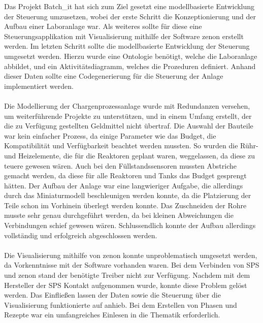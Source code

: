 Das Projekt Batch\_it hat sich zum Ziel gesetzt eine modellbasierte Entwicklung der Steuerung umzusetzen, wobei der erste Schritt die Konzeptionierung und der Aufbau einer Laboranlage war. Als weiteres sollte für diese eine Steuerungsapplikation mit Visualisierung mithilfe der Software zenon erstellt werden. Im letzten Schritt sollte die modellbasierte Entwicklung der Steuerung umgesetzt werden. Hierzu wurde eine Ontologie benötigt, welche die Laboranlage abbildet, und ein Aktivitätsdiagramm, welches die Prozeduren definiert. Anhand dieser Daten sollte eine Codegenerierung für die Steuerung der Anlage implementiert werden. \\\\
Die Modellierung der Chargenprozessanlage wurde mit Redundanzen versehen, um weiterführende Projekte zu unterstützen, und in einem Umfang erstellt, der die zu Verfügung gestellten Geldmittel nicht übertraf. 
Die Auswahl der Bauteile war kein einfacher Prozess, da einige Parameter wie das Budget, die Kompatibilität und Verfügbarkeit beachtet werden mussten. So wurden die Rühr- und Heizelemente, die für die Reaktoren geplant waren, weggelassen, da diese zu teuere gewesen wären. Auch bei den Füllstandssensoren mussten Abstriche gemacht werden, da diese für alle Reaktoren und Tanks das Budget gesprengt hätten.
Der Aufbau der Anlage war eine langwieriger Aufgabe, die allerdings durch das Miniaturmodell beschleunigen werden konnte, da die Platzierung der Teile schon im Vorhinein überlegt werden konnte. Das Zuschneiden der Rohre musste sehr genau durchgeführt werden, da bei kleinen Abweichungen die Verbindungen schief gewesen wären. Schlussendlich konnte der Aufbau allerdings vollständig und erfolgreich abgeschlossen werden. \\\\
Die Visualisierung mithilfe von zenon konnte unproblematisch umgesetzt werden, da Vorkenntnisse mit der Software vorhanden waren. Bei dem Verbinden von SPS und zenon stand der benötigte Treiber nicht zur Verfügung. Nachdem mit dem Hersteller der SPS Kontakt aufgenommen wurde, konnte diese Problem gelöst werden. Das Einfließen lassen der Daten sowie die Steuerung über die Visualisierung funktionierte auf anhieb. Bei dem Erstellen von Phasen und Rezepte war ein umfangreiches Einlesen in die Thematik erforderlich.\\\\
